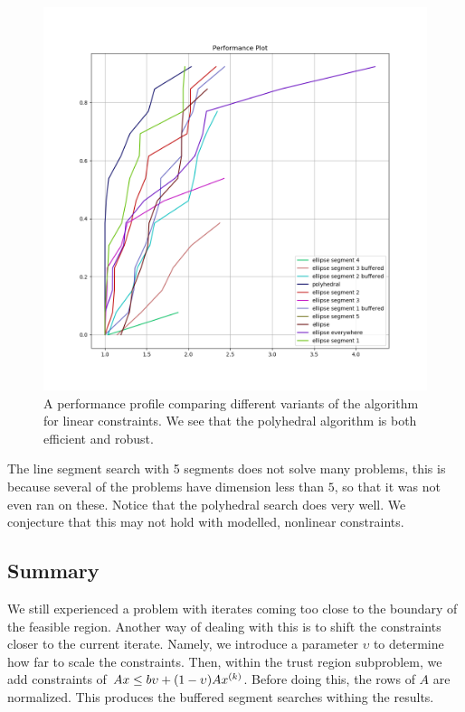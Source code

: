\begin{figure}[ht]
    \centering
    \includegraphics[scale=0.4]{images/performance_profile_plot.png}
    \caption[A performance profile comparing different variants of the algorithm for linear constraints.]{
    	A performance profile comparing different variants of the algorithm for linear constraints.
    	We see that the polyhedral algorithm is both efficient and robust.
    }
    \label{performance_profile_image}
\end{figure}



The line segment search with 5 segments does not solve many problems, this is because several of the problems have dimension less than $5$, so that it was not even ran on these.
Notice that the polyhedral search does very well.
We conjecture that this may not hold with modelled, nonlinear constraints.


\subsection{Summary}
We still experienced a problem with iterates coming too close to the boundary of the feasible region.
Another way of dealing with this is to shift the constraints closer to the current iterate.
Namely, we introduce a parameter $\upsilon$ to determine how far to scale the constraints.
Then, within the trust region subproblem, we add constraints of $Ax \le b\upsilon + (1-\upsilon) A x^{(k)} $.
Before doing this, the rows of $A$ are normalized.
This produces the buffered segment searches withing the results.

